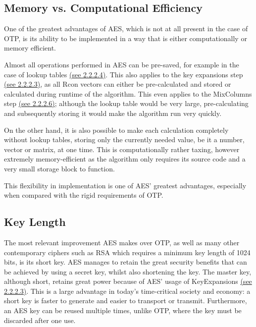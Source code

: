 \documentclass[12pt, a4paper]{report}
\theoremstyle{definition}
\theoremstyle{remark}
\begin{document}
\subsection{Memory vs. Computational Efficiency}
One of the greatest advantages of AES, which is not at all present in the case of OTP, is its ability to be implemented in a way that is either computationally or memory efficient. 

Almost all operations performed in AES can be pre-saved, for example in the case of lookup tables \hyperref[SubBytes]{(see 2.2.2.4)}. This also applies to the key expansions step \hyperref[KeyExpansions]{(see 2.2.2.3)}, as all Rcon vectors can either be pre-calculated and stored or calculated during runtime of the algorithm. This even applies to the MixColumns step \hyperref[MixColumns]{(see 2.2.2.6)}; although the lookup table would be very large, pre-calculating and subsequently storing it would make the algorithm run very quickly.

On the other hand, it is also possible to make each calculation completely without lookup tables, storing only the currently needed value, be it a number, vector or matrix, at one time. This is computationally rather taxing, however extremely memory-efficient as the algorithm only requires its source code and a very small storage block to function.

This flexibility in implementation is one of AES' greatest advantages, especially when compared with the rigid requirements of OTP.

\subsection{Key Length}
The most relevant improvement AES makes over OTP, as well as many other contemporary ciphers such as RSA which requires a minimum key length of 1024 bits, is its short key. AES manages to retain the great security benefits that can be achieved by using a secret key, whilst also shortening the key. The master key, although short, retains great power because of AES' usage of KeyExpansions \hyperref[KeyExpansions]{(see 2.2.2.3)}. This is a large advantage in today's time-critical society and economy: a short key is faster to generate and easier to transport or transmit. Furthermore, an AES key can be reused multiple times, unlike OTP, where the key must be discarded after one use.

\end{document}
